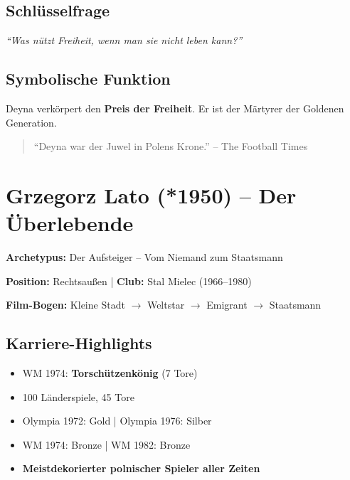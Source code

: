 \documentclass[11pt,a4paper]{book}
\newenvironment{filminfo}{%
  \begin{mdframed}[
    linecolor=darkgray,
    linewidth=1pt,
    backgroundcolor=gray!5,
    innertopmargin=10pt,
    innerbottommargin=10pt
  ]
}{%
  \end{mdframed}
}
\newenvironment{kontextbox}{%
  \begin{mdframed}[
    linecolor=polishred,
    linewidth=1pt,
    backgroundcolor=white,
    leftmargin=20pt,
    rightmargin=20pt
  ]
}{%
  \end{mdframed}
}
\begin{document}
\subsection{Schlüsselfrage}

\begin{kontextbox}
\textit{``Was nützt Freiheit, wenn man sie nicht leben kann?''}
\end{kontextbox}

\subsection{Symbolische Funktion}

Deyna verkörpert den \textbf{Preis der Freiheit}. Er ist der Märtyrer der Goldenen Generation.

\begin{quote}
``Deyna war der Juwel in Polens Krone.'' -- The Football Times
\end{quote}


\section{Grzegorz Lato (*1950) -- Der Überlebende}

\begin{filminfo}
\textbf{Archetypus:} Der Aufsteiger -- Vom Niemand zum Staatsmann

\textbf{Position:} Rechtsaußen | \textbf{Club:} Stal Mielec (1966--1980)

\textbf{Film-Bogen:} Kleine Stadt $\rightarrow$ Weltstar $\rightarrow$ Emigrant $\rightarrow$ Staatsmann
\end{filminfo}

\subsection{Karriere-Highlights}

\begin{itemize}
    \item WM 1974: \textbf{Torschützenkönig} (7 Tore)
    \item 100 Länderspiele, 45 Tore
    \item Olympia 1972: Gold | Olympia 1976: Silber
    \item WM 1974: Bronze | WM 1982: Bronze
    \item \textbf{Meistdekorierter polnischer Spieler aller Zeiten}
\end{itemize}
\end{document}
